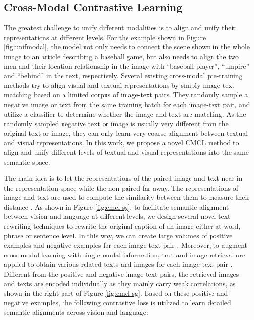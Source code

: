 \documentclass[11pt,a4paper]{article}
\begin{document}
\subsection{Cross-Modal Contrastive Learning}
\label{ssec:cmcl}

The greatest challenge to unify different modalities is to align and unify their representations at different levels.
For the example shown in Figure \ref{fig:unifmodal}, the model not only needs to connect the scene shown in the whole image to an article describing a baseball game, but also needs to align the two men and their location relationship in the image with ``baseball player'', ``umpire'' and ``behind'' in the text, respectively.
Several existing cross-modal pre-training methods try to align visual and textual representations by simply image-text matching \citep{li2019unicoder, chen2020uniter} based on a limited corpus of image-text pairs.
They randomly sample a negative image or text from the same training batch for each image-text pair, and utilize a classifier to determine whether the image and text are matching.
As the randomly sampled negative text or image is usually very different from the original text or image, they can only learn very coarse alignment between textual and visual representations.
In this work, we propose a novel CMCL method to align and unify different levels of textual and visual representations into the same semantic space.


The main idea is to let the representations of the paired image and text near in the representation space while the non-paired far away.
The representations of image  and text  are used to compute the similarity between them to measure their distance .
As shown in Figure \ref{fig:cmcl-sg}, to facilitate semantic alignment between vision and language at different levels, we design several novel text rewriting techniques to rewrite the original caption of an image either at word, phrase or sentence level.
In this way, we can create large volumes of positive examples  and negative examples  for each image-text pair .
Moreover, to augment cross-modal learning with single-modal information, text and image retrieval are applied to obtain various related texts  and images  for each image-text pair .
Different from the positive and negative image-text pairs, the retrieved images and texts are encoded individually as they  mainly carry weak correlations, as shown in the right part of Figure \ref{fig:cmcl-sg}.
Based on these positive and negative examples, the following contrastive loss  is utilized to learn detailed semantic alignments across vision and language:
\end{document}
